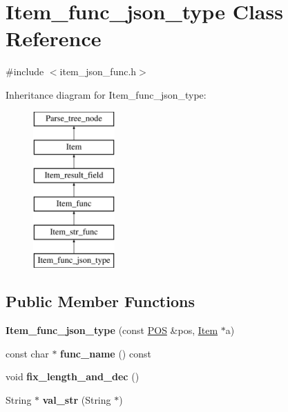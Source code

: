 \hypertarget{classItem__func__json__type}{}\section{Item\+\_\+func\+\_\+json\+\_\+type Class Reference}
\label{classItem__func__json__type}


{\ttfamily \#include $<$item\+\_\+json\+\_\+func.\+h$>$}

Inheritance diagram for Item\+\_\+func\+\_\+json\+\_\+type\+:\begin{figure}[H]
\begin{center}
\leavevmode
\includegraphics[height=6.000000cm]{classItem__func__json__type}
\end{center}
\end{figure}
\subsection*{Public Member Functions}
\begin{DoxyCompactItemize}
\item 
\mbox{\label{classItem__func__json__type_a9366b8777a1d2275818446446d8be93c}} 
{\bfseries Item\+\_\+func\+\_\+json\+\_\+type} (const \mbox{\hyperlink{structYYLTYPE}{P\+OS}} \&pos, \mbox{\hyperlink{classItem}{Item}} $\ast$a)
\item 
\mbox{\label{classItem__func__json__type_aa105cae5af0f87688f1f314dda4b5501}} 
const char $\ast$ {\bfseries func\+\_\+name} () const
\item 
\mbox{\label{classItem__func__json__type_af00aef4c55c295f9e5ea47f3bbf826c3}} 
void {\bfseries fix\+\_\+length\+\_\+and\+\_\+dec} ()
\item 
\mbox{\label{classItem__func__json__type_a2d5280679a350533604380362eb1b259}} 
String $\ast$ {\bfseries val\+\_\+str} (String $\ast$)
\end{DoxyCompactItemize}
